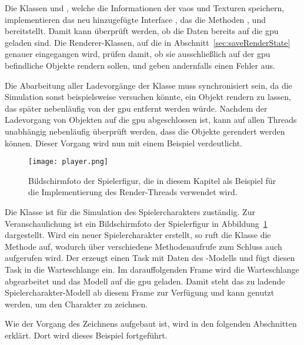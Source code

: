 Die Klassen \classRawModel{} und \classModelTexture{}, welche die Informationen der \acp{vao} und Texturen speichern, implementieren das neu hinzugefügte Interface \classAsyncGraphicsObject{}, das die Methoden 	, 
 und 
 bereitstellt. Damit kann überprüft werden, ob die Daten bereits auf die \ac{gpu} geladen sind. Die Renderer-Klassen, auf die in Abschnitt~\ref{sec:saveRenderState} genauer eingegangen wird, prüfen damit, ob sie ausschließlich auf der \ac{gpu} befindliche Objekte rendern sollen, und geben andernfalls einen Fehler aus.

Die Abarbeitung aller Ladevorgänge der Klasse \classLoader{} muss synchronisiert sein, da die Simulation sonst beispielsweise versuchen könnte, ein Objekt rendern zu lassen, das später nebenläufig von der \ac{gpu} entfernt werden würde. Nachdem der Ladevorgang von Objekten auf die \ac{gpu} abgeschlossen ist, kann auf allen Threads unabhängig nebenläufig überprüft werden, dass die Objekte gerendert werden können. Dieser Vorgang wird nun mit einem Beispiel verdeutlicht.

\begin{figure}
	\centering
	\texttt{[image: player.png]}
	\caption[Bildschirmfoto der Spielerfigur in der Blocklib.]{Bildschirmfoto der Spielerfigur, die in diesem Kapitel als Beispiel für die Implementierung des Render-Threads verwendet wird.}\label{fig:player}
\end{figure}

\begin{example}
	Die Klasse \classPlayer{} ist für die Simulation des Spielercharakters zuständig. Zur Veranschaulichung ist ein Bildschirmfoto der Spielerfigur in Abbildung~\ref{fig:player} dargestellt. Wird ein neuer Spielercharakter erstellt, so ruft die Klasse \classPlayer{} die Methode  auf, wodurch über verschiedene Methodenaufrufe zum Schluss auch  aufgerufen wird. Der \classLoader{} erzeugt einen Task mit Daten des \classPlayer{}-Modells und fügt diesen Task in die Warteschlange ein. Im darauffolgenden Frame wird die Warteschlange abgearbeitet und das Modell auf die \ac{gpu} geladen. Damit steht das zu ladende Spielercharakter-Modell ab diesem Frame zur Verfügung und kann genutzt werden, um den Charakter zu zeichnen. 

	Wie der Vorgang des Zeichnens aufgebaut ist, wird in den folgenden Abschnitten erklärt. Dort wird dieses Beispiel fortgeführt.
\end{example}


